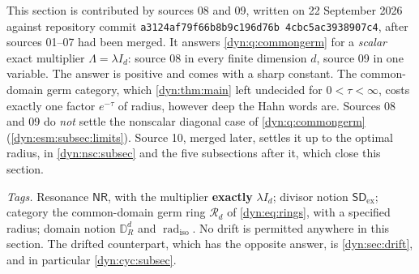 \documentclass[11pt,letterpaper]{article}
\theoremstyle{definition}
\theoremstyle{remark}
\newcommand{\radiso}{\operatorname{rad}_{\mathrm{iso}}}
\newcommand{\sdex}{\mathsf{SD}_{\mathrm{ex}}}
\newcommand{\nres}{\mathsf{NR}}
\numberwithin{equation}{section}
\begin{document}
This section is contributed by sources 08 and 09, written on 22 September
2026 against repository commit
\texttt{a3124af7\allowbreak 9f66b8b9\allowbreak c196d76b\allowbreak
4cbc5ac3\allowbreak 938907c4}, after sources 01--07 had been merged. It
answers \cref{dyn:q:commongerm} for a \emph{scalar} exact multiplier
$\Lambda=\lambda I_d$: source 08 in every finite dimension $d$, source 09
in one variable. The answer is positive and comes with a sharp constant. The
common-domain germ category, which \cref{dyn:thm:main} left undecided for
$0<\tau<\infty$, costs exactly one factor $e^{-\tau}$ of radius, however
deep the Hahn words are. Sources 08 and 09 do \emph{not} settle the
nonscalar diagonal case of \cref{dyn:q:commongerm}
(\cref{dyn:esm:subsec:limits}). Source 10, merged later, settles it up to
the optimal radius, in \cref{dyn:nsc:subsec} and the five subsections after
it, which close this section.

\emph{Tags.} Resonance $\nres$, with the multiplier \textbf{exactly}
$\lambda I_d$; divisor notion $\sdex$; category the common-domain germ ring
$\mathcal R_d$ of \eqref{dyn:eq:rings}, with a specified radius; domain
notion $\mathbb D_R^{d}$ and $\radiso$. No drift is permitted anywhere in
this section. The drifted counterpart, which has the opposite answer, is
\cref{dyn:sec:drift}, and in particular \cref{dyn:cyc:subsec}.
\end{document}
